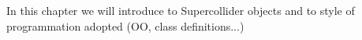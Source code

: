 \documentclass[main.tex]{subfiles}
\begin{document}
In this chapter we will introduce to Supercollider objects and to style of programmation adopted (OO, class definitions...)\\
\newpage
\end{document}
